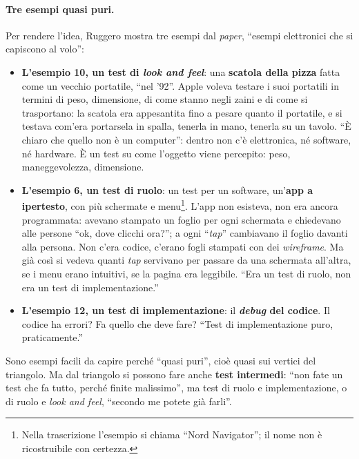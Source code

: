 \paragraph{Tre esempi quasi puri.} Per rendere l'idea, Ruggero mostra tre esempi dal
\emph{paper}, ``esempi elettronici che si capiscono al volo'':
\begin{itemize}
  \item \textbf{L'esempio 10, un test di \emph{look and feel}}: una \textbf{scatola della
        pizza} fatta come un vecchio portatile, ``nel '92''. Apple voleva testare i suoi
        portatili in termini di peso, dimensione, di come stanno negli zaini e di come
        si trasportano: la scatola era appesantita fino a pesare quanto il portatile, e
        si testava com'era portarsela in spalla, tenerla in mano, tenerla su un tavolo.
        ``È chiaro che quello non è un computer'': dentro non c'è elettronica, né
        software, né hardware. È un test su come l'oggetto viene percepito: peso,
        maneggevolezza, dimensione.
  \item \textbf{L'esempio 6, un test di ruolo}: un test per un software,
        un'\textbf{app a ipertesto}, con più schermate e menu\footnote{Nella trascrizione
        l'esempio si chiama ``Nord Navigator''; il nome non è ricostruibile con
        certezza.}. L'app non esisteva, non era ancora programmata: avevano stampato un
        foglio per ogni schermata e chiedevano alle persone ``ok, dove clicchi ora?''; a
        ogni ``\emph{tap}'' cambiavano il foglio davanti alla persona. Non c'era codice,
        c'erano fogli stampati con dei \emph{wireframe}. Ma già così si vedeva quanti
        \emph{tap} servivano per passare da una schermata all'altra, se i menu erano
        intuitivi, se la pagina era leggibile. ``Era un test di ruolo, non era un test
        di implementazione.''
  \item \textbf{L'esempio 12, un test di implementazione}: il \textbf{\emph{debug} del
        codice}. Il codice ha errori? Fa quello che deve fare? ``Test di implementazione
        puro, praticamente.''
\end{itemize}
Sono esempi facili da capire perché ``quasi puri'', cioè quasi sui vertici del
triangolo. Ma dal triangolo si possono fare anche \textbf{test intermedi}: ``non fate un
test che fa tutto, perché finite malissimo'', ma test di ruolo e implementazione, o di
ruolo e \emph{look and feel}, ``secondo me potete già farli''.


